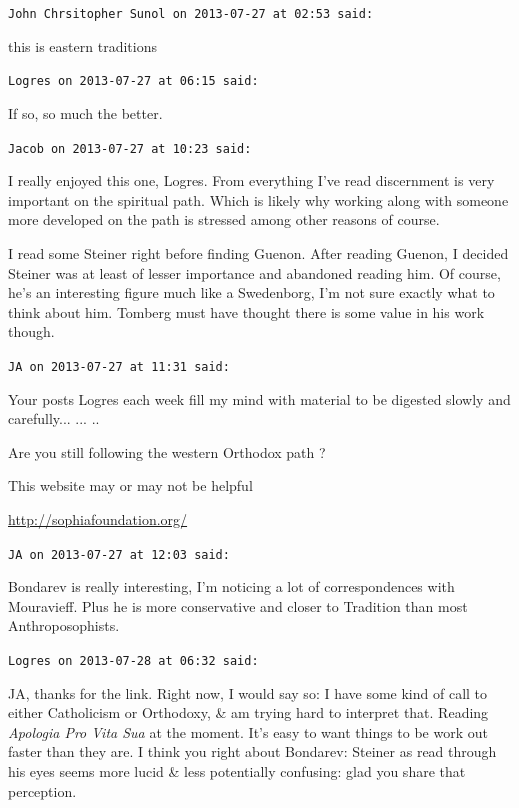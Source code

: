 \begin{footnotesize}
\begin{sffamily}
\texttt{John Chrsitopher Sunol on 2013-07-27 at 02:53 said:}

this is eastern traditions

\hfill

\texttt{Logres on 2013-07-27 at 06:15 said:}

If so, so much the better.

\hfill

\texttt{Jacob on 2013-07-27 at 10:23 said:}

I really enjoyed this one, Logres. From everything I've read discernment is very important on the spiritual path. Which is likely why working along with someone more developed on the path is stressed among other reasons of course.

I read some Steiner right before finding Guenon. After reading Guenon, I decided Steiner was at least of lesser importance and abandoned reading him. Of course, he's an interesting figure much like a Swedenborg, I'm not sure exactly what to think about him. Tomberg must have thought there is some value in his work though.

\hfill

\texttt{JA on 2013-07-27 at 11:31 said:}

Your posts Logres each week fill my mind with material to be digested slowly and carefully... ... ..

Are you still following the western Orthodox path ?

This website may or may not be helpful

\url{http://sophiafoundation.org/}


\hfill

\texttt{JA on 2013-07-27 at 12:03 said:}

Bondarev is really interesting, I'm noticing a lot of correspondences with Mouravieff. Plus he is more conservative and closer to Tradition than most Anthroposophists.

\hfill

\texttt{Logres on 2013-07-28 at 06:32 said:}

JA, thanks for the link. Right now, I would say so: I have some kind of call to either Catholicism or Orthodoxy, \& am trying hard to interpret that. Reading \textit{Apologia Pro Vita Sua} at the moment. It's easy to want things to be work out faster than they are. I think you right about Bondarev: Steiner as read through his eyes seems more lucid \& less potentially confusing: glad you share that perception.


\end{sffamily}
\end{footnotesize}
